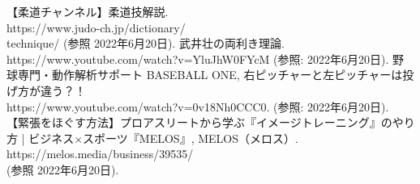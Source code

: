 \documentclass[a4paper,10pt,twocolumn]{jsarticle}
\begin{document}
\begin{thebibliography}{4}
    【柔道チャンネル】柔道技解説. \\ https://www.judo-ch.jp/dictionary/\\technique/ (参照 2022年6月20日).
    武井壮の両利き理論. \\ https://www.youtube.com/watch?v=YluJhW0FYcM (参照: 2022年6月20日).
    野球専門・動作解析サポート BASEBALL ONE, 右ピッチャーと左ピッチャーは投げ方が違う？！\\ https://www.youtube.com/watch?v=0v18Nh0CCC0. (参照: 2022年6月20日).
    【緊張をほぐす方法】プロアスリートから学ぶ『イメージトレーニング』のやり方 | ビジネス×スポーツ『MELOS』, MELOS（メロス）. https://melos.media/business/39535/ \\ (参照 2022年6月20日).
\end{thebibliography}
\end{document}
